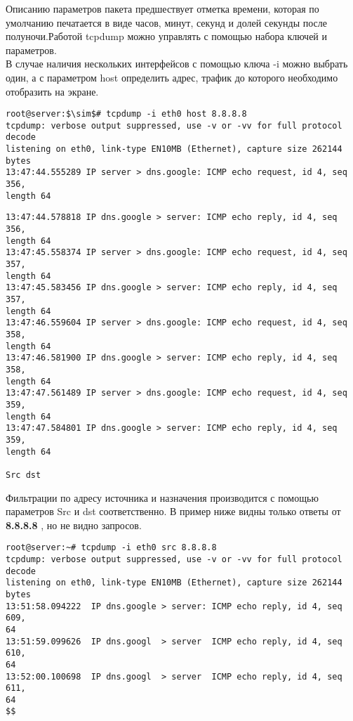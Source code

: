 \documentclass[14pt, a4paper]{article}
\begin{document}
Описанию параметров пакета предшествует отметка времени, которая по умолчанию печатается в
виде часов, минут, секунд и долей секунды после полуночи.Работой tcpdump можно управлять с
помощью набора ключей и параметров.\\

В случае наличия нескольких интерфейсов с помощью ключа -i можно выбрать один, а с параметром
\colorbox{backcolour}{host} определить адрес, трафик до которого необходимо отобразить на экране.

\vspace{0.3cm}
\begin{lstlisting}
root@server:$\sim$# tcpdump -i eth0 host 8.8.8.8
tcpdump: verbose output suppressed, use -v or -vv for full protocol decode
listening on eth0, link-type EN10MB (Ethernet), capture size 262144 bytes
13:47:44.555289 IP server > dns.google: ICMP echo request, id 4, seq 356, 
length 64
\end{lstlisting}

\newpage

\begin{lstlisting}
13:47:44.578818 IP dns.google > server: ICMP echo reply, id 4, seq 356, 
length 64
13:47:45.558374 IP server > dns.google: ICMP echo request, id 4, seq 357, 
length 64
13:47:45.583456 IP dns.google > server: ICMP echo reply, id 4, seq 357, 
length 64
13:47:46.559604 IP server > dns.google: ICMP echo request, id 4, seq 358, 
length 64
13:47:46.581900 IP dns.google > server: ICMP echo reply, id 4, seq 358, 
length 64
13:47:47.561489 IP server > dns.google: ICMP echo request, id 4, seq 359, 
length 64
13:47:47.584801 IP dns.google > server: ICMP echo reply, id 4, seq 359, 
length 64

Src dst
\end{lstlisting}
\vspace{0.2cm}

Фильтрации по адресу источника и назначения производится с помощью параметров \colorbox{backcolour}{Src} и \colorbox{backcolour}{dst}
соответственно. В пример ниже видны только ответы от \textbf{8.8.8.8} , но не видно запросов.

\vspace{0.3cm}
\begin{lstlisting}
root@server:~# tcpdump -i eth0 src 8.8.8.8
tcpdump: verbose output suppressed, use -v or -vv for full protocol decode
listening on eth0, link-type EN10MB (Ethernet), capture size 262144 bytes
13:51:58.094222  IP dns.google > server: ICMP echo reply, id 4, seq 609,
64
13:51:59.099626  IP dns.googl  > server  ICMP echo reply, id 4, seq 610,
64
13:52:00.100698  IP dns.googl  > server  ICMP echo reply, id 4, seq 611,
64
$$
\end{lstlisting}
\vspace{0.2cm}
\end{document}
